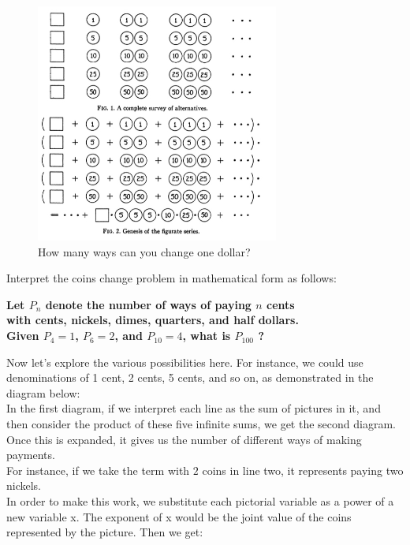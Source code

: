 \documentclass{article}
\theoremstyle{definition}
\theoremstyle{question}
\begin{document}
\begin{figure}[h!]
    \centering
    \includegraphics[width=8cm]{images/coins-change.jpg}
    \caption{How many ways can you change one dollar?}
\end{figure}

\newpage
\noindent Interpret the coins change problem in mathematical form as follows: \\

\noindent 
\begin{center}\textbf{\noindent Let \( P_n \) denote the number of ways of paying \( n \) cents \\ with cents, nickels, dimes, quarters, and half dollars.\\ Given \(P_4=1\), \(P_6=2\), and \(P_{10}=4\), what is \(P_{100}\) ?}
\end{center}

\noindent Now let's explore the various possibilities here. For instance, we could use denominations of 1 cent, 2 cents, 5 cents, and so on, as demonstrated in the diagram below: \\

\noindent In the first diagram, if we interpret each line as the sum of pictures in it, and then consider the product of these five infinite sums, we get the second diagram. Once this is expanded, it gives us the number of different ways of making payments. \\

\noindent For instance, if we take the term with \(2\) coins in line two, it represents paying two nickels. \\

\noindent In order to make this work, we substitute each pictorial variable as a power of a new variable x. The exponent of x would be the joint value of the coins represented by the  picture. Then we get:
\end{document}
